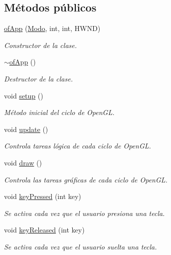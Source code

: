 \subsection*{Métodos públicos}
\begin{DoxyCompactItemize}
\item 
\hyperlink{classof_app_a43e833d2c9b04c5a0bcddfbbfc479e45}{of\+App} (\hyperlink{classof_app_aab1f96029bf7fd45f397fc24647f3494}{Modo}, int, int, H\+W\+N\+D)
\begin{DoxyCompactList}\small\item\em Constructor de la clase. \end{DoxyCompactList}\item 
\hyperlink{classof_app_a46d5e370034c47f5fc1a530bcb331c27}{$\sim$of\+App} ()
\begin{DoxyCompactList}\small\item\em Destructor de la clase. \end{DoxyCompactList}\item 
void \hyperlink{classof_app_af68eaa1366244f7a541cd08e02199c12}{setup} ()
\begin{DoxyCompactList}\small\item\em Método inicial del ciclo de Open\+G\+L. \end{DoxyCompactList}\item 
void \hyperlink{classof_app_afef41ea4aee5a22ea530afba33ae7a7b}{update} ()
\begin{DoxyCompactList}\small\item\em Controla tareas lógica de cada ciclo de Open\+G\+L. \end{DoxyCompactList}\item 
void \hyperlink{classof_app_a75dd45437b9e317db73d8daef1ad49f8}{draw} ()
\begin{DoxyCompactList}\small\item\em Controla las tareas gráficas de cada ciclo de Open\+G\+L. \end{DoxyCompactList}\item 
void \hyperlink{classof_app_a957d3197364bbac8e67eaa4f15b28ad3}{key\+Pressed} (int key)
\begin{DoxyCompactList}\small\item\em Se activa cada vez que el usuario presiona una tecla. \end{DoxyCompactList}\item 
void \hyperlink{classof_app_aa1503a87453bcfdd395fe4acca5d91a0}{key\+Released} (int key)
\begin{DoxyCompactList}\small\item\em Se activa cada vez que el usuario suelta una tecla. \end{DoxyCompactList}\item 

\end{DoxyCompactItemize}

